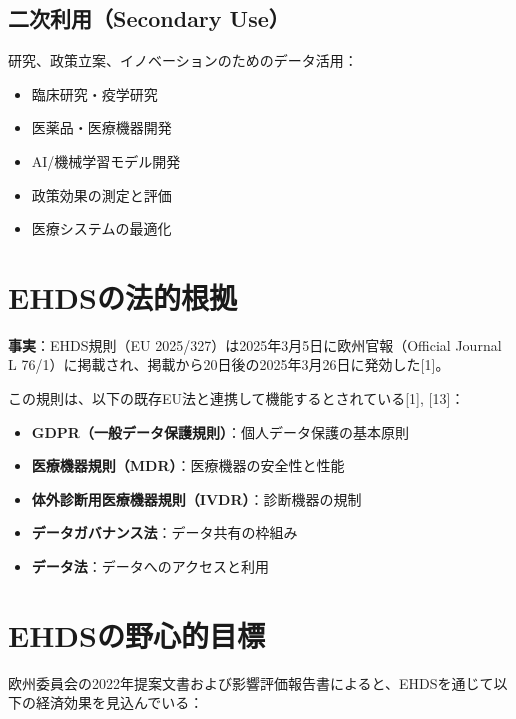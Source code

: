\documentclass[
  a4paper,
  a4paper,
  11pt]{ltjsbook}
\providecommand{\tightlist}{%
  \setlength{\itemsep}{0pt}\setlength{\parskip}{0pt}}
\begin{document}
\subsection{二次利用（Secondary
Use）}\label{ux4e8cux6b21ux5229ux7528secondary-use}

研究、政策立案、イノベーションのためのデータ活用：

\begin{itemize}
\tightlist
\item
  臨床研究・疫学研究
\item
  医薬品・医療機器開発
\item
  AI/機械学習モデル開発
\item
  政策効果の測定と評価
\item
  医療システムの最適化
\end{itemize}

\section{EHDSの法的根拠}\label{ehdsux306eux6cd5ux7684ux6839ux62e0}

\textbf{事実}：EHDS規則（EU 2025/327）は2025年3月5日に欧州官報（Official
Journal L
76/1）に掲載され、掲載から20日後の2025年3月26日に発効した{[}1{]}。

この規則は、以下の既存EU法と連携して機能するとされている{[}1{]},
{[}13{]}：

\begin{itemize}
\tightlist
\item
  \textbf{GDPR（一般データ保護規則）}：個人データ保護の基本原則
\item
  \textbf{医療機器規則（MDR）}：医療機器の安全性と性能
\item
  \textbf{体外診断用医療機器規則（IVDR）}：診断機器の規制
\item
  \textbf{データガバナンス法}：データ共有の枠組み
\item
  \textbf{データ法}：データへのアクセスと利用
\end{itemize}

\section{EHDSの野心的目標}\label{ehdsux306eux91ceux5fc3ux7684ux76eeux6a19}

欧州委員会の2022年提案文書および影響評価報告書によると、EHDSを通じて以下の経済効果を見込んでいる：
\end{document}
